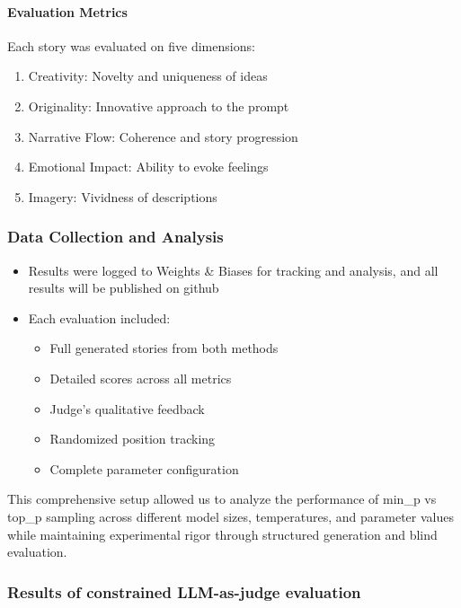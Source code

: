 \documentclass{article}
\begin{document}
\paragraph{Evaluation Metrics}
Each story was evaluated on five dimensions:
\begin{enumerate}
    \item Creativity: Novelty and uniqueness of ideas
    \item Originality: Innovative approach to the prompt
    \item Narrative Flow: Coherence and story progression
    \item Emotional Impact: Ability to evoke feelings
    \item Imagery: Vividness of descriptions
\end{enumerate}

\subsubsection{Data Collection and Analysis}

\begin{itemize}
    \item Results were logged to Weights \& Biases for tracking and analysis, and all results will be published on github
    \item Each evaluation included:
    \begin{itemize}
        \item Full generated stories from both methods
        \item Detailed scores across all metrics
        \item Judge's qualitative feedback
        \item Randomized position tracking
        \item Complete parameter configuration
    \end{itemize}
\end{itemize}

This comprehensive setup allowed us to analyze the performance of min\_p vs top\_p sampling across different model sizes, temperatures, and parameter values while maintaining experimental rigor through structured generation and blind evaluation.

\subsubsection{Results of constrained LLM-as-judge evaluation}
\label{sec:constrained_llm_judge}
\end{document}
